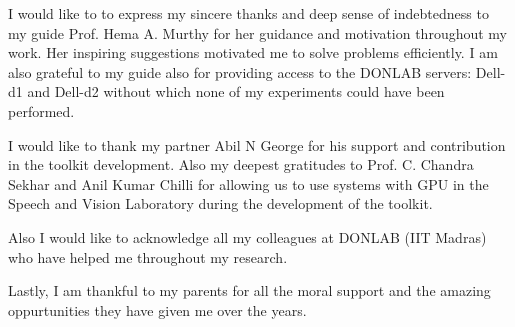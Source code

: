 \acknowledgements
I would like to to express my sincere thanks and deep sense of indebtedness to my guide Prof. Hema A.  Murthy for her guidance and motivation throughout my work.  Her inspiring suggestions motivated me to solve problems efficiently.  I am also grateful to my guide also for providing access to the DONLAB servers: Dell-d1 and Dell-d2 without which none of my experiments could have been performed.

\par I would like to thank my partner Abil N George for his support and contribution in the toolkit development.  Also my deepest gratitudes to Prof. C. Chandra Sekhar and Anil Kumar Chilli for allowing us to use systems with GPU in the Speech and Vision Laboratory during the development of the toolkit. 

\par Also I would like to acknowledge all my colleagues at DONLAB (IIT Madras) who have helped me throughout my research. 
 
\par Lastly, I am thankful to my parents for all the moral support and the amazing oppurtunities they have given me over the years.

